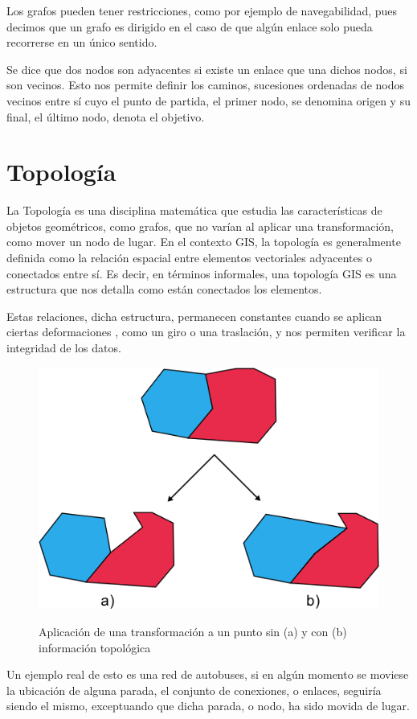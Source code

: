 Los grafos pueden tener restricciones, como por ejemplo de navegabilidad, pues decimos que un grafo es dirigido en el caso de que algún enlace solo pueda recorrerse en un único sentido.

Se dice que dos nodos son adyacentes si existe un enlace que una dichos nodos, si son vecinos. Esto nos permite definir los caminos, sucesiones ordenadas de nodos vecinos entre sí cuyo el punto de partida, el primer nodo, se denomina origen y su final, el último nodo, denota el objetivo.

\section{Topología}
La Topología \autocite[96]{volaya} es una disciplina matemática que estudia las características de objetos geométricos, como grafos, que no varían al aplicar una transformación, como mover un nodo de lugar. En el contexto GIS, la topología es generalmente definida \autocite{gfeTopo} como la relación espacial entre elementos vectoriales adyacentes o conectados entre sí. Es decir, en términos informales, una topología GIS es una estructura que nos detalla como están conectados los elementos. 

Estas relaciones, dicha estructura, permanecen constantes cuando se aplican ciertas deformaciones \autocite[310]{obehsu}, como un giro o una traslación, y nos permiten verificar la integridad de los datos. 

\begin{figure}[htbp]
	\centering
	\includegraphics[width=.7\textwidth]{img/topo_modification.png}\\
	\autocite[97]{volaya}
	\caption[Topología geográfica y modificación]{Aplicación de una transformación a un punto sin (a) y con (b) información topológica}
\end{figure}

Un ejemplo real de esto es una red de autobuses, si en algún momento se moviese la ubicación de alguna parada, el conjunto de conexiones, o enlaces, seguiría siendo el mismo, exceptuando que dicha parada, o nodo, ha sido movida de lugar.

